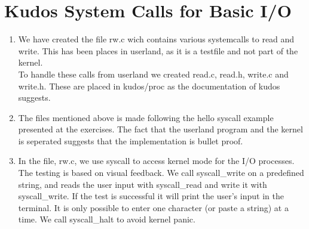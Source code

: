 \documentclass[12pt]{article}
\begin{document}
\section*{Kudos System Calls for Basic I/O}  
\begin{enumerate}
\item We have created the file rw.c wich contains various systemcalls to read and write. This has been places in userland, as it is a testfile and not part of the kernel. \\ To handle these calls from userland we created read.c, read.h, write.c and write.h. These are placed in kudos/proc as the documentation of kudos suggests. 
\item The files mentioned above is made following the hello syscall example presented at the exercises. The fact that the userland program and the kernel is seperated suggests that the implementation is bullet proof. 
\item In the file, rw.c, we use syscall to access kernel mode for the I/O processes. The testing is based on visual feedback. We call syscall\_write on a predefined string, and reads the user input with syscall\_read and write it with syscall\_write. If the test is successful it will print the user's input in the terminal. It is only possible to enter one character (or paste a string) at a time. We call syscall\_halt to avoid kernel panic. 
\end{enumerate}
\end{document}
